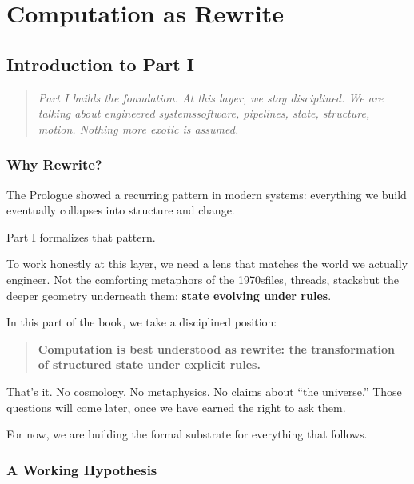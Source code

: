 \part{Computation as Rewrite}
\label{part:rewrite}

\chapter*{Introduction to Part I}

\begin{quote}
\emph{Part I builds the foundation. At this layer, we stay disciplined.  
We are talking about engineered systems\emdash{}software, pipelines, state, structure, motion.  
Nothing more exotic is assumed.}
\end{quote}

\bigskip

\section*{Why Rewrite?}
\label{sec:why-rewrite}

The Prologue showed a recurring pattern in modern systems:  
everything we build eventually collapses into structure and change.

Part I formalizes that pattern.

To work honestly at this layer, we need a lens that matches the world we actually engineer.  
Not the comforting metaphors of the 1970s\emdash{}files, threads, stacks\emdash{}but the deeper
geometry underneath them: \textbf{state evolving under rules}.

In this part of the book, we take a disciplined position:

\begin{quote}
\textbf{Computation is best understood as rewrite:  
the transformation of structured state under explicit rules.}
\end{quote}

That’s it.  
No cosmology. No metaphysics. No claims about “the universe.”  
Those questions will come later, once we have earned the right to ask them.

For now, we are building the formal substrate for everything that follows.

\bigskip

\section*{A Working Hypothesis}
\label{sec:working-hypothesis}

